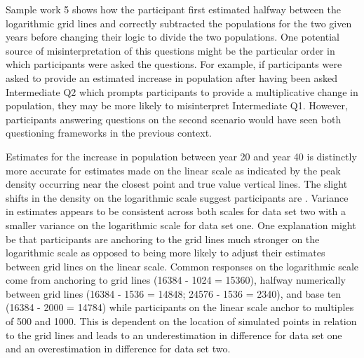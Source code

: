 \documentclass[print]{nuthesis}
\begin{document}
Sample work 5 shows how the participant first estimated halfway between the logarithmic grid lines and correctly subtracted the populations for the two given years before changing their logic to divide the two populations.
One potential source of misinterpretation of this questions might be the particular order in which participants were asked the questions.
For example, if participants were asked to provide an estimated increase in population after having been asked Intermediate Q2 which prompts participants to provide a multiplicative change in population, they may be more likely to misinterpret Intermediate Q1.
However, participants answering questions on the second scenario would have seen both questioning frameworks in the previous context.

Estimates for the increase in population between year 20 and year 40 is distinctly more accurate for estimates made on the linear scale as indicated by the peak density occurring near the closest point and true value vertical lines.
The slight shifts in the density on the logarithmic scale suggest participants are .
Variance in estimates appears to be consistent across both scales for data set two with a smaller variance on the logarithmic scale for data set one.
One explanation might be that participants are anchoring to the grid lines much stronger on the logarithmic scale as opposed to being more likely to adjust their estimates between grid lines on the linear scale.
Common responses  on the logarithmic scale come from anchoring to grid lines (16384 - 1024 = 15360), halfway numerically between grid lines (16384 - 1536 = 14848; 24576 - 1536 = 2340), and base ten (16384 - 2000 = 14784) while participants on the linear scale anchor to multiples of 500 and 1000.
This is dependent on the location of simulated points in relation to the grid lines and leads to an underestimation in difference for data set one and an overestimation in difference for data set two.
\end{document}
